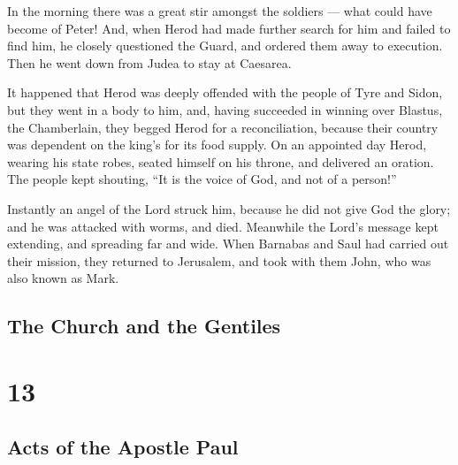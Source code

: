  In the morning there was a great stir amongst the soldiers
--- what could have become of Peter!  And, when Herod had
made further search for him and failed to find him, he closely
questioned the Guard, and ordered them away to execution. Then he went
down from Judea to stay at Caesarea.

 It happened that Herod was deeply offended with the people
of Tyre and Sidon, but they went in a body to him, and, having succeeded
in winning over Blastus, the Chamberlain, they begged Herod for a
reconciliation, because their country was dependent on the king's for
its food supply.  On an appointed day Herod, wearing his
state robes, seated himself on his throne, and delivered an oration.
 The people kept shouting, ``It is the voice of God, and
not of a person!''

 Instantly an angel of the Lord struck him, because he did
not give God the glory; and he was attacked with worms, and died.
 Meanwhile the Lord's message kept extending, and spreading
far and wide.  When Barnabas and Saul had carried out their
mission, they returned to Jerusalem, and took with them John, who was
also known as Mark.

\hypertarget{the-church-and-the-gentiles}{%
\subsection{The Church and the
Gentiles}\label{the-church-and-the-gentiles}}

\hypertarget{section-12}{%
\section{13}\label{section-12}}

\hypertarget{acts-of-the-apostle-paul}{%
\subsection{Acts of the Apostle Paul}\label{acts-of-the-apostle-paul}}

